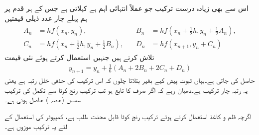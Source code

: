 اس سے بھی زیادہ درست ترکیب جو عملاً انتہائی اہم ہے  کہلاتی ہے جس کے ہر قدم پر ہم پہلے چار عدد ذیلی قیمتیں
\begin{gather}
\begin{aligned}\label{مساوات_اعدادی_رنج_کوٹا_الف}
A_n&=hf(x_n,y_n),\\
C_n&=hf(x_n+\tfrac{1}{2}h,y_n+\tfrac{1}{2}B_n),
\end{aligned}
\quad 
\begin{aligned}
B_n&=hf(x_n+\tfrac{1}{2}h,y_n+\tfrac{1}{2}A_n),\\
D_n&=hf(x_{n+1},y_n+C_n)
\end{aligned}
\end{gather}
 تلاش کرتے ہیں جنہیں استعمال کرتے ہوئے نئی قیمت
\begin{align}\label{مثال_اعدادی_ترکیب_یولر_ب}
y_{n+1}=y_n+\tfrac{1}{6}(A_n+2B_n+2C_n+D_n)
\end{align}
حاصل کی جاتی ہے۔یہاں ثبوت پیش کیے بغیر بتلاتا چلوں کہ اس ترکیب کی حذفی خلل رتبہ  ہے یعنی یہ رتبہ چار ترکیب  ہے۔دھیان رہے کہ اگر  صرف  کا تابع ہو تب ترکیب رنج کوٹا سے تکمل کی ترکیب سمسن (حصہ ) حاصل ہوتی ہے۔

اگرچہ قلم و کاغذ استعمال کرتے ہوئے ترکیب رنج کوٹا قابل محنت طلب ہے، کمپیوٹر کی استعمال کے لئے یہ ترکیب موزوں ہے۔

